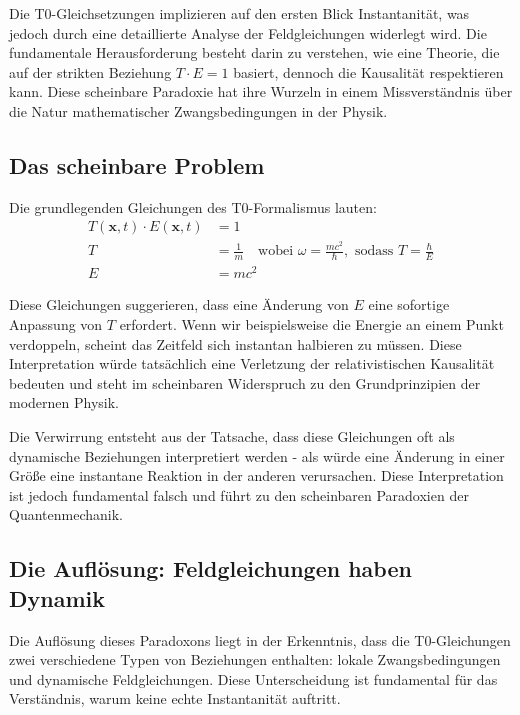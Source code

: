 	Die T0-Gleichsetzungen implizieren auf den ersten Blick Instantanität, was jedoch durch eine detaillierte Analyse der Feldgleichungen widerlegt wird. Die fundamentale Herausforderung besteht darin zu verstehen, wie eine Theorie, die auf der strikten Beziehung $T \cdot E = 1$ basiert, dennoch die Kausalität respektieren kann. Diese scheinbare Paradoxie hat ihre Wurzeln in einem Missverständnis über die Natur mathematischer Zwangsbedingungen in der Physik.
	
	\subsection{Das scheinbare Problem}
	
	Die grundlegenden Gleichungen des T0-Formalismus lauten:
	\begin{align}
		T(\mathbf{x},t) \cdot E(\mathbf{x},t) &= 1 \label{eq:TE_constraint} \\
		T &= \frac{1}{m} \quad \text{wobei } \omega = \frac{mc^2}{\hbar}, \text{ sodass } T = \frac{\hbar}{E} \label{eq:T_definition} \\
		E &= mc^2 \label{eq:E_definition}
	\end{align}
	
	Diese Gleichungen suggerieren, dass eine Änderung von $E$ eine sofortige Anpassung von $T$ erfordert. Wenn wir beispielsweise die Energie an einem Punkt verdoppeln, scheint das Zeitfeld sich instantan halbieren zu müssen. Diese Interpretation würde tatsächlich eine Verletzung der relativistischen Kausalität bedeuten und steht im scheinbaren Widerspruch zu den Grundprinzipien der modernen Physik.
	
	Die Verwirrung entsteht aus der Tatsache, dass diese Gleichungen oft als dynamische Beziehungen interpretiert werden - als würde eine Änderung in einer Größe eine instantane Reaktion in der anderen verursachen. Diese Interpretation ist jedoch fundamental falsch und führt zu den scheinbaren Paradoxien der Quantenmechanik.
	
	\subsection{Die Auflösung: Feldgleichungen haben Dynamik}
	
	Die Auflösung dieses Paradoxons liegt in der Erkenntnis, dass die T0-Gleichungen zwei verschiedene Typen von Beziehungen enthalten: lokale Zwangsbedingungen und dynamische Feldgleichungen. Diese Unterscheidung ist fundamental für das Verständnis, warum keine echte Instantanität auftritt.
	
